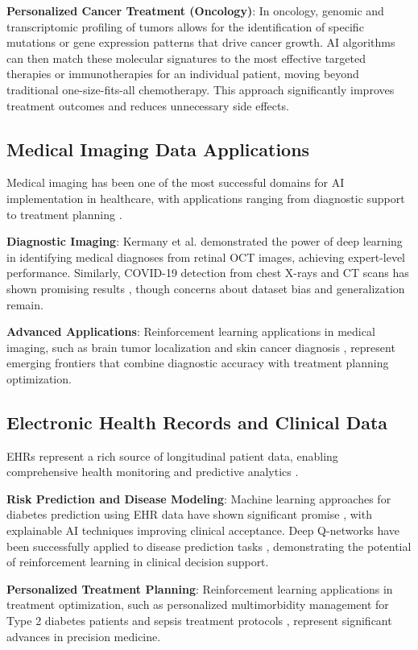 \documentclass[runningheads]{llncs}
\begin{document}
\textbf{Personalized Cancer Treatment (Oncology)}: In oncology, genomic and transcriptomic profiling of tumors allows for the identification of specific mutations or gene expression patterns that drive cancer growth. AI algorithms can then match these molecular signatures to the most effective targeted therapies or immunotherapies for an individual patient, moving beyond traditional one-size-fits-all chemotherapy. This approach significantly improves treatment outcomes and reduces unnecessary side effects.

\subsection{Medical Imaging Data Applications}
Medical imaging has been one of the most successful domains for AI implementation in healthcare, with applications ranging from diagnostic support to treatment planning \cite{article_21}.

\textbf{Diagnostic Imaging}: Kermany et al. \cite{article_21} demonstrated the power of deep learning in identifying medical diagnoses from retinal OCT images, achieving expert-level performance. Similarly, COVID-19 detection from chest X-rays and CT scans has shown promising results \cite{article_20,article_23}, though concerns about dataset bias and generalization remain.

\textbf{Advanced Applications}: Reinforcement learning applications in medical imaging, such as brain tumor localization \cite{article_12} and skin cancer diagnosis \cite{article_11}, represent emerging frontiers that combine diagnostic accuracy with treatment planning optimization.

\subsection{Electronic Health Records and Clinical Data}
EHRs represent a rich source of longitudinal patient data, enabling comprehensive health monitoring and predictive analytics \cite{article_10}.

\textbf{Risk Prediction and Disease Modeling}: Machine learning approaches for diabetes prediction using EHR data have shown significant promise \cite{article_2}, with explainable AI techniques improving clinical acceptance. Deep Q-networks have been successfully applied to disease prediction tasks \cite{article_10}, demonstrating the potential of reinforcement learning in clinical decision support.

\textbf{Personalized Treatment Planning}: Reinforcement learning applications in treatment optimization, such as personalized multimorbidity management for Type 2 diabetes patients \cite{article_18} and sepsis treatment protocols \cite{article_13}, represent significant advances in precision medicine.
\end{document}
